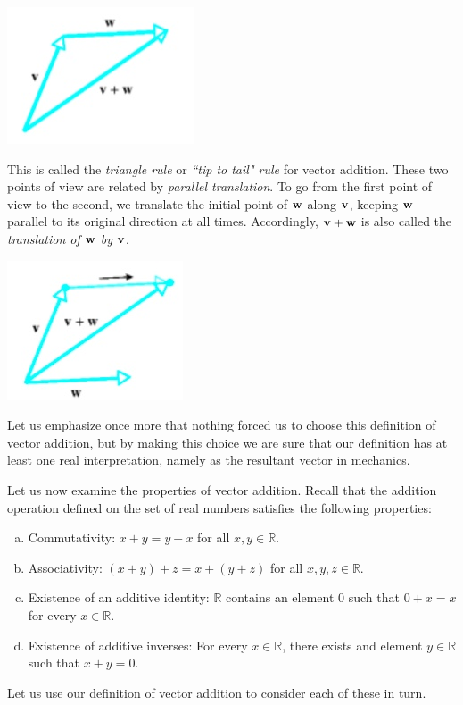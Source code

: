 \documentclass[12pt,letterpaper,reqno]{article}
\numberwithin{equation}{section}
\newcommand{\ti}[1]{\textit{#1}}
\begin{document}
\begin{center}
	\includegraphics[scale=0.5]{figures_mvc/tip_to_tail}
\end{center}
This is called the \ti{triangle rule} or \ti{``tip to tail" rule} for vector addition. These two points of view are related by \ti{parallel translation}. To go from the first point of view to the second, we translate the initial point of ${\bf w}$ along ${\bf v}$, keeping ${\bf w}$ parallel to its original direction at all times. Accordingly, ${\bf v}+{\bf w}$ is also called the \ti{translation of ${\bf w}$ by ${\bf v}$}.
\begin{center}
	\includegraphics[scale=0.5]{figures_mvc/translation_of_v_by_w}
\end{center}
Let us emphasize once more that nothing forced us to choose this definition of vector addition, but by making this choice we are sure that our definition has at least one real interpretation, namely as the resultant vector in mechanics.

Let us now examine the properties of vector addition. Recall that the addition operation defined on the set of real numbers satisfies the following properties:
\begin{enumerate}[(a)]
	\item Commutativity: $x+y=y+x$ for all $x,y \in \mathbb{R}$.
	\item Associativity: $(x+y)+z=x+(y+z)$ for all $x,y,z \in \mathbb{R}$.
	\item Existence of an additive identity: $\mathbb{R}$ contains an element 0 such that $0+x=x$ for every $x \in \mathbb{R}$.
	\item Existence of additive inverses: For every $x \in \mathbb{R}$, there exists and element $y \in \mathbb{R}$ such that $x+y=0$.
\end{enumerate}
Let us use our definition of vector addition to consider each of these in turn.
\end{document}

